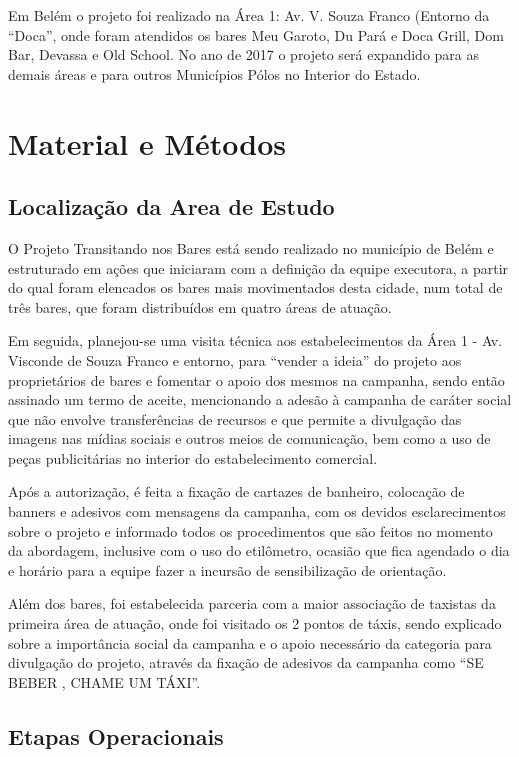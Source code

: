 Em Belém o projeto foi realizado na Área 1: Av. V. Souza Franco (Entorno da “Doca”, onde foram atendidos os bares Meu Garoto, Du Pará e Doca Grill, Dom Bar, Devassa e Old School. No ano de 2017 o projeto será expandido para as demais áreas e para outros Municípios Pólos no Interior do Estado.


\section{Material e Métodos}
\subsection{Localização da Area de Estudo}

O Projeto Transitando nos Bares está sendo realizado no município de Belém e estruturado em ações que iniciaram com a definição da equipe executora, a partir do qual foram elencados os bares mais movimentados desta cidade, num total de três bares, que foram distribuídos em quatro áreas de atuação. \vskip0.3cm


Em seguida, planejou-se uma visita técnica aos estabelecimentos da Área 1 - Av. Visconde de Souza Franco e entorno, para “vender a ideia” do projeto aos proprietários de bares e fomentar o apoio dos mesmos na campanha, sendo então assinado um termo de aceite, mencionando a adesão à campanha de caráter social que não envolve transferências de recursos e que permite a divulgação das imagens nas mídias sociais e outros meios de comunicação, bem como a uso de peças publicitárias no interior do estabelecimento comercial.\vskip0.3cm 

Após a autorização, é feita a fixação de cartazes de banheiro, colocação de banners e adesivos com mensagens da campanha, com os devidos esclarecimentos sobre o projeto e informado todos os procedimentos que são feitos no momento da abordagem, inclusive com o uso do etilômetro, ocasião que fica agendado o dia e horário para a equipe fazer a incursão de sensibilização de orientação.\vskip0.3cm 

Além dos bares, foi estabelecida parceria com a maior associação de taxistas da primeira área de atuação, onde foi visitado os 2 pontos de táxis, sendo explicado sobre a importância social da campanha e o apoio necessário da categoria para divulgação do projeto, através da fixação de adesivos da campanha como “SE BEBER , CHAME UM TÁXI”.\vskip0.3cm

\subsection{Etapas Operacionais}

